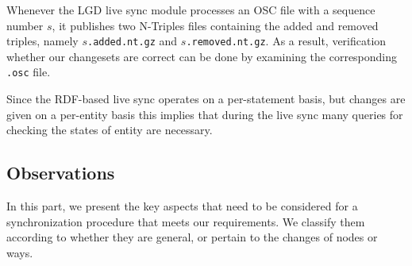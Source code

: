 Whenever the LGD live sync module processes an OSC file with a sequence
number $s$, it publishes two N-Triples files containing the added and removed
triples, namely \texttt{$s$.added.nt.gz} and \texttt{$s$.removed.nt.gz}.
As a result, verification whether our changesets are correct can be done by
examining the corresponding \texttt{.osc} file.


Since the RDF-based live sync operates on a per-statement basis, but changes are
given on a per-entity basis this implies that during the live sync many
queries for checking the states of entity are necessary.



\subsection{Observations}
In this part, we present the key aspects that need to be considered for a
synchronization procedure that meets our requirements. We
classify them according to whether they are general, or pertain to the changes
of nodes or ways.

